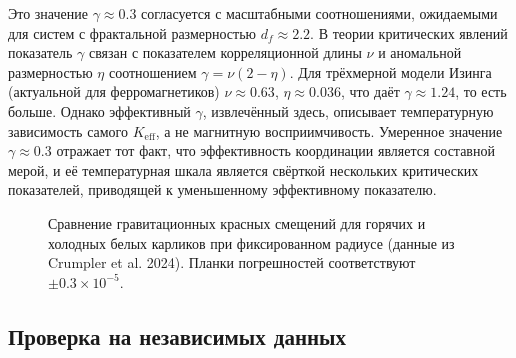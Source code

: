 \documentclass[12pt]{article}
\theoremstyle{remark}
\newcommand{\Keff}{K_{\mathrm{eff}}}
\newcommand{\df}{d_{\!f}}
\begin{document}
	Это значение $\gamma \approx 0.3$ согласуется с масштабными соотношениями, ожидаемыми для систем с фрактальной размерностью $\df \approx 2.2$. В теории критических явлений показатель $\gamma$ связан с показателем корреляционной длины $\nu$ и аномальной размерностью $\eta$ соотношением $\gamma = \nu(2-\eta)$. Для трёхмерной модели Изинга (актуальной для ферромагнетиков) $\nu \approx 0.63$, $\eta \approx 0.036$, что даёт $\gamma \approx 1.24$, то есть больше. Однако эффективный $\gamma$, извлечённый здесь, описывает температурную зависимость самого $\Keff$, а не магнитную восприимчивость. Умеренное значение $\gamma \approx 0.3$ отражает тот факт, что эффективность координации является составной мерой, и её температурная шкала является свёрткой нескольких критических показателей, приводящей к уменьшенному эффективному показателю.
	
	\begin{figure}[htbp]
		\centering
		\caption{Сравнение гравитационных красных смещений для горячих и холодных белых карликов при фиксированном радиусе (данные из Crumpler et al. 2024). Планки погрешностей соответствуют $\pm0.3\times10^{-5}$.}
		\label{fig:wd-redshift}
	\end{figure}
	
	\subsection{Проверка на независимых данных}
	\label{subsec:wd-verification}
	
\end{document}
